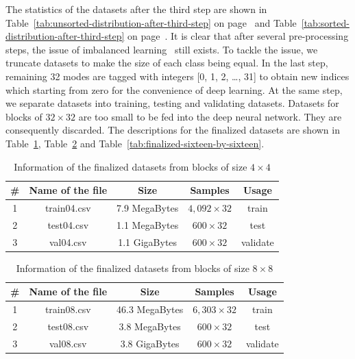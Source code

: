 The statistics of the datasets after the third step are
shown in Table~\ref{tab:unsorted-distribution-after-third-step}
on page~\pageref{tab:unsorted-distribution-after-third-step} and 
Table~\ref{tab:sorted-distribution-after-third-step}
on page~\pageref{tab:sorted-distribution-after-third-step}.
It is clear that after several pre-processing steps,
the issue of imbalanced learning~\parencite{RN215}
still exists.
To tackle the issue, we truncate datasets to make the
size of each class being equal.
In the last step, remaining 32 modes are tagged with integers
[0, 1, 2, \ldots, 31] to obtain new indices which
starting from zero for the convenience of deep learning.
At the same step, we separate datasets into training, 
testing and validating datasets.
Datasets for blocks of \(32\times32\) are too small
to be fed into the deep neural network.
They are consequently discarded.
The descriptions for the finalized datasets
are shown in Table~\ref{tab:finalized-four-by-four},
Table~\ref{tab:finalized-eight-by-eight}
and Table~\ref{tab:finalized-sixteen-by-sixteen}.
\begin{table}[H]
    \caption{Information of the finalized datasets from blocks of size \(4\times4\)}
    \bigskip\label{tab:finalized-four-by-four}
    \centering
    \begin{tabular}{c c c c c}
        \toprule
        \# & Name of the file & Size & Samples & Usage\\
        \midrule
        1 & train04.csv & 7.9 MegaBytes & \(4,092\times32\) & train\\
        2 & test04.csv & 1.1 MegaBytes & \(600\times32\) & test\\
        3 & val04.csv & 1.1 GigaBytes & \(600\times32\) & validate\\
        \bottomrule
    \end{tabular}
\end{table}

\begin{table}[H]
    \caption{Information of the finalized datasets from blocks of size \(8\times8\)}
    \bigskip\label{tab:finalized-eight-by-eight}
    \centering
    \begin{tabular}{c c c c c}
        \toprule
        \# & Name of the file & Size & Samples & Usage\\
        \midrule
        1 & train08.csv & 46.3 MegaBytes & \(6,303\times32\) & train\\
        2 & test08.csv & 3.8 MegaBytes & \(600\times32\) & test\\
        3 & val08.csv & 3.8 GigaBytes & \(600\times32\) & validate\\
        \bottomrule
    \end{tabular}
\end{table}

